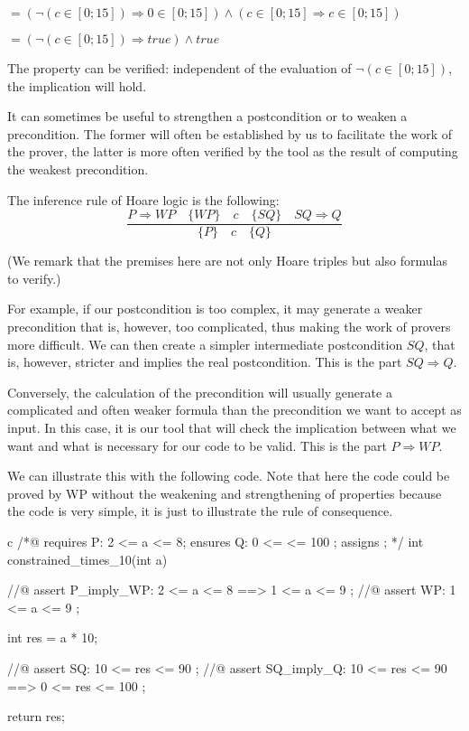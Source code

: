 $= (\neg (c \in [0;15]) \Rightarrow 0 \in [0;15]) \wedge (c \in [0;15] \Rightarrow c \in [0;15])$



$= (\neg (c \in [0;15]) \Rightarrow true) \wedge true$



The property can be verified: independent of the evaluation of
$\neg (c \in [0;15])$, the implication will hold.



\label{l3:statements-basic-consequence}


It can sometimes be useful to strengthen a postcondition or to weaken a
precondition. The former will often be established by us to
facilitate the work of the prover, the latter is more often verified by
the tool as the result of computing the weakest precondition.



The inference rule of Hoare logic is the following:
$$\dfrac{P \Rightarrow WP \quad \{WP\}\quad c\quad \{SQ\} \quad SQ \Rightarrow Q}{\{P\}\quad c \quad \{Q\}}$$

(We remark that the premises here are not only Hoare triples but also
formulas to verify.)

For example, if our postcondition is too complex, it may generate a
weaker precondition that is, however, too complicated, thus making the
work of provers more difficult. We can then create a simpler
intermediate postcondition $SQ$, that is, however, stricter and
implies the real postcondition. This is the part $SQ \Rightarrow Q$.

Conversely, the calculation of the precondition will usually generate a
complicated and often weaker formula than the precondition we want to
accept as input. In this case, it is our tool that will check the
implication between what we want and what is necessary for our code to
be valid. This is the part $P \Rightarrow WP$.

We can illustrate this with the following code. Note that here the code
could be proved by WP without the weakening and strengthening of
properties because the code is very simple, it is just to illustrate the
rule of consequence.



\begin{CodeBlock}{c}
/*@
  requires P: 2 <= a <= 8;
  ensures  Q: 0 <= \result <= 100 ;
  assigns  \nothing ;
*/
int constrained_times_10(int a){
  //@ assert P_imply_WP: 2 <= a <= 8 ==> 1 <= a <= 9 ;
  //@ assert WP:         1 <= a <= 9 ;

  int res = a * 10;

  //@ assert SQ:         10 <= res <= 90 ;
  //@ assert SQ_imply_Q: 10 <= res <= 90 ==> 0 <= res <= 100 ;

  return res;
}
\end{CodeBlock}




